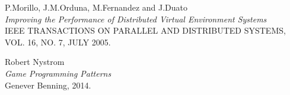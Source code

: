 \cleardoublepage
{}
{}
\begin{thebibliography}{}

 P.Morillo, J.M.Orduna, M.Fernandez and J.Duato \\
  \emph{Improving the Performance of Distributed Virtual Environment
Systems} \\
  IEEE TRANSACTIONS ON PARALLEL AND DISTRIBUTED SYSTEMS, VOL. 16, NO. 7,
JULY 2005.

 Robert Nystrom \\
  \emph{Game Programming Patterns} \\
  Genever Benning, 2014.

\end{thebibliography}

